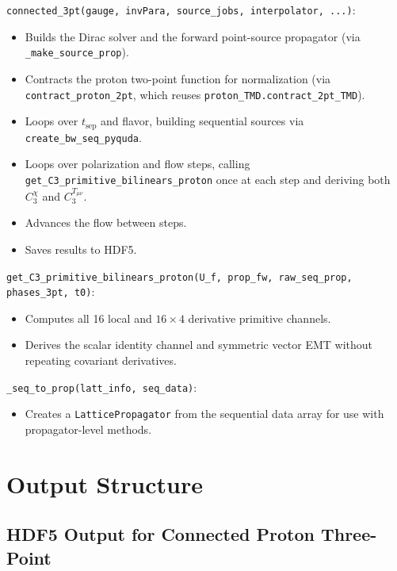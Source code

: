 \documentclass[11pt,a4paper]{article}
\begin{document}
\medskip\noindent
\texttt{connected\_3pt(gauge, invPara, source\_jobs, interpolator, ...)}:
\begin{itemize}
  \item Builds the Dirac solver and the forward point-source propagator
        (via \texttt{\_make\_source\_prop}).
  \item Contracts the proton two-point function for normalization
        (via \texttt{contract\_proton\_2pt}, which reuses
        \texttt{proton\_TMD.contract\_2pt\_TMD}).
  \item Loops over $t_{\text{sep}}$ and flavor, building sequential sources
        via \texttt{create\_bw\_seq\_pyquda}.
  \item Loops over polarization and flow steps, calling
        \texttt{get\_C3\_primitive\_bilinears\_proton} once at each step and
        deriving both \(C_3^\chi\) and \(C_3^{T_{\mu\nu}}\).
  \item Advances the flow between steps.
  \item Saves results to HDF5.
\end{itemize}

\medskip\noindent
\texttt{get\_C3\_primitive\_bilinears\_proton(U\_f, prop\_fw, raw\_seq\_prop, phases\_3pt, t0)}:
\begin{itemize}
  \item Computes all 16 local and $16\times4$ derivative primitive channels.
  \item Derives the scalar identity channel and symmetric vector EMT without
        repeating covariant derivatives.
\end{itemize}

\medskip\noindent
\texttt{\_seq\_to\_prop(latt\_info, seq\_data)}:
\begin{itemize}
  \item Creates a \texttt{LatticePropagator} from the sequential data array
        for use with propagator-level methods.
\end{itemize}

\section{Output Structure}

\subsection{HDF5 Output for Connected Proton Three-Point}
\end{document}
